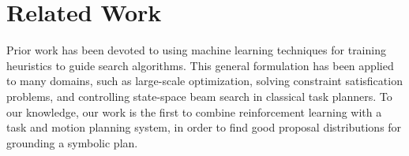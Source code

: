 \section{Related Work}
Prior work has been devoted to using machine learning techniques for
training heuristics to guide search algorithms. This general formulation
has been applied to many domains, such as large-scale optimization,
solving constraint satisfication problems, and controlling state-space beam
search in classical task planners. To our knowledge, our work is the
first to combine reinforcement learning with a task and motion planning
system, in order to find good proposal distributions for grounding a symbolic
plan.
